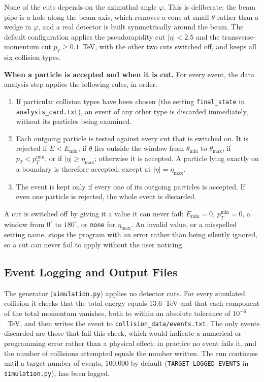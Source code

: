 \documentclass{article}
\begin{document}
None of the cuts depends on the azimuthal angle $\varphi$. This is deliberate: the beam pipe is a hole along the beam axis, which removes a cone at small $\theta$ rather than a wedge in $\varphi$, and a real detector is built symmetrically around the beam. The default configuration applies the pseudorapidity cut $|\eta| < 2.5$ and the transverse-momentum cut $p_T \ge 0.1$~TeV, with the other two cuts switched off, and keeps all six collision types.

\par\textbf{When a particle is accepted and when it is cut.} For every event, the data analysis step applies the following rules, in order.
\begin{enumerate}
    \item If particular collision types have been chosen (the setting \texttt{final\_state} in \texttt{analysis\_card.txt}), an event of any other type is discarded immediately, without its particles being examined.
    \item Each outgoing particle is tested against every cut that is switched on. It is rejected if $E < E_{\min}$, if $\theta$ lies outside the window from $\theta_{\min}$ to $\theta_{\max}$, if $p_T < p_T^{\min}$, or if $|\eta| \ge \eta_{\max}$; otherwise it is accepted. A particle lying exactly on a boundary is therefore accepted, except at $|\eta| = \eta_{\max}$.
    \item The event is kept only if every one of its outgoing particles is accepted. If even one particle is rejected, the whole event is discarded.
\end{enumerate}
A cut is switched off by giving it a value it can never fail: $E_{\min} = 0$, $p_T^{\min} = 0$, a window from $0^\circ$ to $180^\circ$, or \texttt{none} for $\eta_{\max}$. An invalid value, or a misspelled setting name, stops the program with an error rather than being silently ignored, so a cut can never fail to apply without the user noticing.

\subsection{Event Logging and Output Files}
\label{ssec:event_logging}
The generator (\texttt{simulation.py}) applies no detector cuts. For every simulated collision it checks that the total energy equals $13.6$~TeV and that each component of the total momentum vanishes, both to within an absolute tolerance of $10^{-6}$~TeV, and then writes the event to \texttt{collision\_data/events.txt}. The only events discarded are those that fail this check, which would indicate a numerical or programming error rather than a physical effect; in practice no event fails it, and the number of collisions attempted equals the number written. The run continues until a target number of events, 100{,}000 by default (\texttt{TARGET\_LOGGED\_EVENTS} in \texttt{simulation.py}), has been logged.
\end{document}
